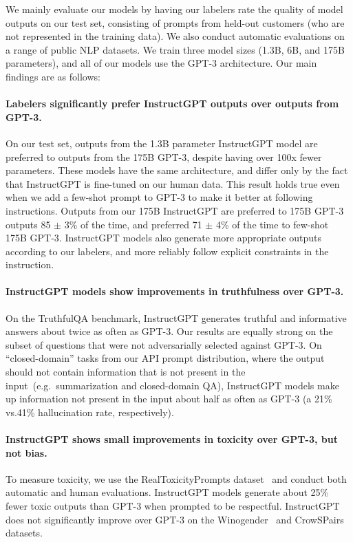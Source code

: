 We mainly evaluate our models by having our labelers rate the quality of model outputs on our test set, consisting of prompts from held-out customers (who are not represented in the training data). We also conduct automatic evaluations on a range of public NLP datasets. We train three model sizes (1.3B, 6B, and 175B parameters), and all of our models use the GPT-3 architecture. 
Our main findings are as follows:

\paragraph{Labelers significantly prefer InstructGPT outputs over outputs from GPT-3.} On our test set, outputs from the 1.3B parameter InstructGPT model are preferred to outputs from the 175B GPT-3, despite having over 100x fewer parameters. These models have the same architecture, and differ only by the fact that InstructGPT is fine-tuned on our human data. This result holds true even when we add a few-shot prompt to GPT-3 to make it better at following instructions. 
Outputs from our 175B InstructGPT are preferred to 175B GPT-3 outputs 85 $\pm$ 3\% of the time, and preferred 71 $\pm$ 4\% of the time to few-shot 175B GPT-3. InstructGPT models also generate more appropriate outputs according to our labelers, and more reliably follow explicit constraints in the instruction.

\paragraph{InstructGPT models show improvements in truthfulness over GPT-3.} On the TruthfulQA benchmark, InstructGPT generates truthful and informative answers about twice as often as GPT-3. Our results are equally strong on the subset of questions that were not adversarially selected against GPT-3. On ``closed-domain'' tasks from our API prompt distribution, where the output should not contain information that is not present in the input~(e.g.\ summarization and closed-domain QA), InstructGPT models make up information not present in the input about half as often as GPT-3 (a 21\% vs.\@ 41\% hallucination rate, respectively).

\paragraph{InstructGPT shows small improvements in toxicity over GPT-3, but not bias.} To measure toxicity, we use the RealToxicityPrompts dataset~\citep{gehman2020realtoxicityprompts} and conduct both automatic and human evaluations. InstructGPT models generate about 25\% fewer toxic outputs than GPT-3 when prompted to be respectful. InstructGPT does not significantly improve over GPT-3 on the Winogender~\citep{rudinger2018gender} and CrowSPairs~\citep{nangia2020crows} datasets.    

